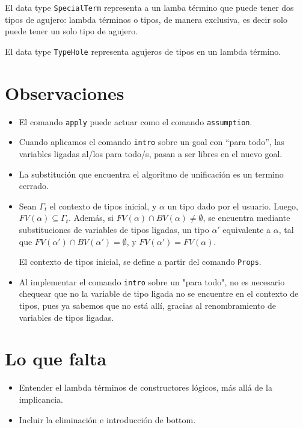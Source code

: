 \documentclass[a4paper,11pt]{article}
\begin{document}
El data type \texttt{SpecialTerm} representa a un lamba término que puede tener dos tipos de agujero: lambda términos o tipos, de manera
exclusiva, es decir solo puede tener un solo tipo de agujero.

El data type \texttt{TypeHole} representa agujeros de tipos en un lambda término.


\section{Observaciones}
\begin{itemize}
  \item El comando \texttt{apply} puede actuar como el comando \texttt{assumption}.
  \item Cuando aplicamos el comando \texttt{intro} sobre un goal con ``para todo'', las variables
  ligadas al/los para todo/s, pasan a ser libres en el nuevo goal. 
  \item La substitución que encuentra el algoritmo de unificación es un termino cerrado.
  \item Sean $\Gamma_{t}$ el contexto de tipos inicial, y $\alpha$ un tipo dado por el usuario. Luego, $FV(\alpha) \subseteq \Gamma_{t}$.
  Además, si $FV(\alpha) \cap BV(\alpha) \neq  \emptyset$, se encuentra mediante substituciones de variables de tipos ligadas, un tipo $\alpha'$ 
  equivalente a $\alpha$, tal que $FV(\alpha') \cap BV(\alpha') = \emptyset$, y $FV(\alpha') = FV(\alpha)$.
  
  El contexto de tipos inicial, se define a partir del comando \texttt{Props}.
  
  \item Al implementar el comando \texttt{intro} sobre un "para todo", no es necesario chequear que no la variable de tipo ligada no se encuentre
  en el contexto de tipos, pues ya sabemos que no está allí, gracias al renombramiento de variables de tipos ligadas.

\end{itemize}


\section{Lo que falta}
\begin{itemize}
  \item Entender el lambda términos de constructores lógicos, más allá de la implicancia.
  \item Incluir la eliminación e introducción de bottom.
\end{itemize}
\end{document}

